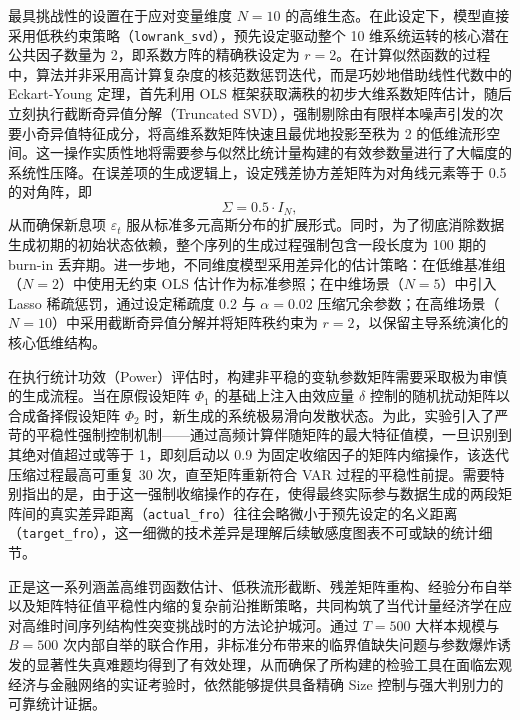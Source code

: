 \documentclass[UTF8,a4paper,12pt]{ctexbook}
\begin{document}
最具挑战性的设置在于应对变量维度 $N=10$ 的高维生态。在此设定下，模型直接采用低秩约束策略（\texttt{lowrank\_svd}），预先设定驱动整个 10 维系统运转的核心潜在公共因子数量为 2，即系数方阵的精确秩设定为 $r=2$。在计算似然函数的过程中，算法并非采用高计算复杂度的核范数惩罚迭代，而是巧妙地借助线性代数中的 Eckart-Young 定理，首先利用 OLS 框架获取满秩的初步大维系数矩阵估计，随后立刻执行截断奇异值分解（Truncated SVD），强制剔除由有限样本噪声引发的次要小奇异值特征成分，将高维系数矩阵快速且最优地投影至秩为 2 的低维流形空间。这一操作实质性地将需要参与似然比统计量构建的有效参数量进行了大幅度的系统性压降。在误差项的生成逻辑上，设定残差协方差矩阵为对角线元素等于 0.5 的对角阵，即
\begin{equation}
\Sigma = 0.5 \cdot I_N,
\end{equation}
从而确保新息项 $\varepsilon_t$ 服从标准多元高斯分布的扩展形式。同时，为了彻底消除数据生成初期的初始状态依赖，整个序列的生成过程强制包含一段长度为 100 期的 burn-in 丢弃期。进一步地，不同维度模型采用差异化的估计策略：在低维基准组（$N=2$）中使用无约束 OLS 估计作为标准参照；在中维场景（$N=5$）中引入 Lasso 稀疏惩罚，通过设定稀疏度 0.2 与 $\alpha=0.02$ 压缩冗余参数；在高维场景（$N=10$）中采用截断奇异值分解并将矩阵秩约束为 $r=2$，以保留主导系统演化的核心低维结构。


在执行统计功效（Power）评估时，构建非平稳的变轨参数矩阵需要采取极为审慎的生成流程。当在原假设矩阵 $\Phi_1$ 的基础上注入由效应量 $\delta$ 控制的随机扰动矩阵以合成备择假设矩阵 $\Phi_2$ 时，新生成的系统极易滑向发散状态。为此，实验引入了严苛的平稳性强制控制机制——通过高频计算伴随矩阵的最大特征值模，一旦识别到其绝对值超过或等于 1，即刻启动以 0.9 为固定收缩因子的矩阵内缩操作，该迭代压缩过程最高可重复 30 次，直至矩阵重新符合 VAR 过程的平稳性前提。需要特别指出的是，由于这一强制收缩操作的存在，使得最终实际参与数据生成的两段矩阵间的真实差异距离（\texttt{actual\_fro}）往往会略微小于预先设定的名义距离（\texttt{target\_fro}），这一细微的技术差异是理解后续敏感度图表不可或缺的统计细节。

正是这一系列涵盖高维罚函数估计、低秩流形截断、残差矩阵重构、经验分布自举以及矩阵特征值平稳性内缩的复杂前沿推断策略，共同构筑了当代计量经济学在应对高维时间序列结构性突变挑战时的方法论护城河。通过 $T=500$ 大样本规模与 $B=500$ 次内部自举的联合作用，非标准分布带来的临界值缺失问题与参数爆炸诱发的显著性失真难题均得到了有效处理，从而确保了所构建的检验工具在面临宏观经济与金融网络的实证考验时，依然能够提供具备精确 Size 控制与强大判别力的可靠统计证据。
\end{document}
